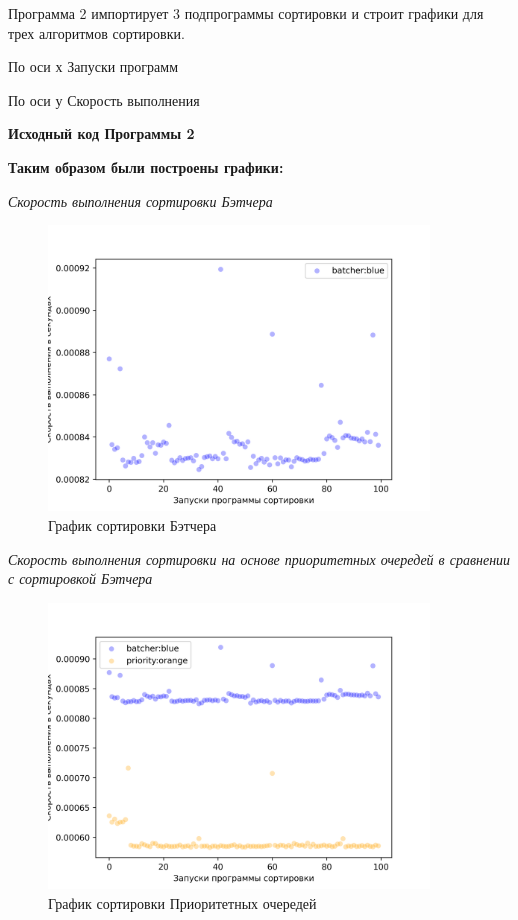 Программа 2 импортирует 3 подпрограммы сортировки и строит графики для трех алгоритмов сортировки.

По оси х Запуски программ

По оси у Скорость выполнения 

\textbf{Исходный код Программы 2}




\newpage
\textbf{Таким образом были построены графики:}

\textit{Скорость выполнения сортировки Бэтчера}

\begin{figure}[H]
    \centering
    \includegraphics[width=0.9\textwidth]{./plots/batcher_speed.png}
    \caption{График сортировки Бэтчера}
\end{figure}


\textit{Скорость выполнения сортировки на основе приоритетных очередей в сравнении с сортировкой Бэтчера}

\begin{figure}[H]
    \centering
    \includegraphics[width=0.9\textwidth]{./plots/priority_speed.png}
    \caption{График сортировки Приоритетных очередей}
\end{figure}



